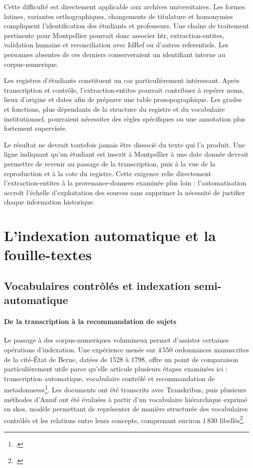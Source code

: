 Cette difficulté est directement applicable aux archives universitaires. Les formes latines, variantes orthographiques, changements de titulature et homonymies compliquent l'identification des étudiants et professeurs. Une chaîne de traitement pertinente pour Montpellier pourrait donc associer \gls{htr}, \gls{extraction-entites}, validation humaine et \gls{reconciliation} avec IdRef ou d'autres \glspl{referentiel}. Les personnes absentes de ces derniers conserveraient un identifiant interne au \gls{corpus-numerique}.

Les registres d'étudiants constituent un cas particulièrement intéressant. Après transcription et contrôle, l'\gls{extraction-entites} pourrait contribuer à repérer noms, lieux d'origine et dates afin de préparer une table prosopographique. Les grades et fonctions, plus dépendants de la structure du registre et du vocabulaire institutionnel, pourraient nécessiter des règles spécifiques ou une annotation plus fortement supervisée.

Le résultat ne devrait toutefois jamais être dissocié du texte qui l'a produit. Une ligne indiquant qu'un étudiant est inscrit à Montpellier à une date donnée devrait permettre de revenir au passage de la transcription, puis à la vue de la reproduction et à la cote du registre. Cette exigence relie directement l'\gls{extraction-entites} à la \gls{provenance-donnees} examinée plus loin : l'automatisation accroît l'échelle d'exploitation des sources sans supprimer la nécessité de justifier chaque information historique.



\section{L'indexation automatique et la \gls{fouille-textes}}

\subsection{Vocabulaires contrôlés et indexation semi-automatique}

\paragraph{De la transcription à la recommandation de sujets}

Le passage à des \glspl{corpus-numerique} volumineux permet d'assister certaines opérations d'indexation. Une expérience menée sur 4\,550 ordonnances manuscrites de la cité-État de Berne, datées de 1528 à 1798, offre un point de comparaison particulièrement utile parce qu'elle articule plusieurs étapes examinées ici : transcription automatique, vocabulaire contrôlé et recommandation de \glspl{metadonnees}\footcite{RomeinVeldhoenRomein2026}. Les documents ont été transcrits avec Transkribus, puis plusieurs méthodes d'Annif ont été évaluées à partir d'un vocabulaire hiérarchique exprimé en \gls{skos}, modèle permettant de représenter de manière structurée des vocabulaires contrôlés et les relations entre leurs concepts, comprenant environ 1\,830 libellés\footcite{RomeinVeldhoenRomein2026}.

